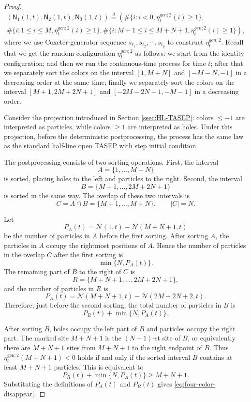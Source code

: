 \documentclass[12pt,a4paper]{amsart}
\theoremstyle{remark}
\numberwithin{equation}{section} \numberwithin{theorem}{section}
\begin{document}
\begin{proof}
\begin{multline}
\left(\mathsf{N}_{1} (1,t) , \mathsf{N}_{2} (1,t), \mathsf{N}_{3} (1,t) \right) \stackrel{d}{=} \left( \#\{i: i<0, \eta_{t}^{gen;2}(i) \geq 1\}, \right. \\ 
\left. \#\{i: 1 \leq i \leq M, \eta_{t}^{gen;2}(i) \geq 1\},  \#\{i: M+1 \leq i \leq M+N+1, \eta_{t}^{gen;2}(i) \geq 1\}\right),
\end{multline}
where we use Coxeter-generator sequence $s_{\ell_1}, s_{\ell_2}, \cdots,s_{\ell_p}$ to construct $\eta_{t}^{gen;2}$. Recall that we get the random configuration $\eta_{t}^{gen;2}$ as follows: we start from the identity configuration; and then we run the continuous-time process for time $t$; after that we separately sort the colors on the interval $[1,M+N]$ and $[-M-N,-1]$ in a decreasing order at the same time; finally we separately sort the colors on the interval $[M+1,2M+2N+1]$ and $[-2M-2N-1,-M-1]$ in a decreasing order. 


Consider the projection introduced in Section \ref{ssec:HL-TASEP}: colors $\leq -1$ are interpreted as particles, while colors $\geq 1$ are interpreted as holes. 
Under this projection, before the deterministic postprocessing, the process has the same law as the standard half-line open TASEP with step initial condition.

The postprocessing consists of two sorting operations. 
First, the interval
\[
A=\{1,\ldots,M+N\}
\]
is sorted, placing holes to the left and particles to the right. 
Second, the interval
\[
B=\{M+1,\ldots,2M+2N+1\}
\]
is sorted in the same way. 
The overlap of these two intervals is
\[
C=A\cap B=\{M+1,\ldots,M+N\}, \qquad |C|=N.
\]

Let
\[
P_A(t)=\mathcal N(1,t)-\mathcal N(M+N+1,t)
\]
be the number of particles in $A$ before the first sorting. 
After sorting $A$, the particles in $A$ occupy the rightmost positions of $A$. 
Hence the number of particles in the overlap $C$ after the first sorting is
\[
\min\{N,P_A(t)\}.
\]
The remaining part of $B$ to the right of $C$ is
\[
R=\{M+N+1,\ldots,2M+2N+1\},
\]
and the number of particles in $R$ is
\[
P_R(t)=\mathcal N(M+N+1,t)-\mathcal N(2M+2N+2,t).
\]
Therefore, just before the second sorting, the total number of particles in $B$ is
\[
P_R(t)+\min\{N,P_A(t)\}.
\]

After sorting $B$, holes occupy the left part of $B$ and particles occupy the right part. 
The marked site $M+N+1$ is the $(N+1)$-st site of $B$, or equivalently there are $M+N+1$ sites from $M+N+1$ to the right endpoint of $B$. 
Thus $\eta_t^{\mathrm{gen};2}(M+N+1)<0$ holds if and only if the sorted interval $B$ contains at least $M+N+1$ particles. 
This is equivalent to
\[
P_R(t)+\min\{N,P_A(t)\}\geq M+N+1.
\]
Substituting the definitions of $P_A(t)$ and $P_R(t)$ gives \eqref{eq:four-color-disappear}.



\end{proof}
\end{document}
